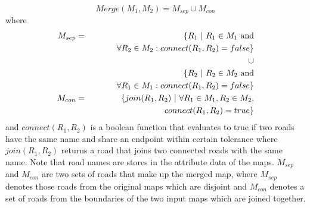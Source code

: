 \[
Merge(M_1, M_2) = M_{sep} \cup M_{con}
\]
where
\begin{eqnarray*}
M_{sep} &=& \{ R_1 ~|~ R_1 \in M_1~ {\rm and} \\
&& \hspace*{1cm} \forall R_2 \in M_2: connect(R_1, R_2) = false \} \\ 
&&\cup \\
&& \{ R_2 ~|~ R_2 \in M_2~ {\rm and}\\
&& \hspace*{1cm} \forall R_1 \in M_1: connect(R_1, R_2) = false \} \\
M_{con} &=& \{join(R_1, R_2) ~|~ \forall R_1 \in M_1, R_2 \in M_2, \\
&& \hspace*{1cm} connect(R_1, R_2) = true \} \\
\end{eqnarray*}
and $connect(R_1, R_2)$ is a boolean function that evaluates to true if
two roads have the same name and share an endpoint within certain tolerance
where $join(R_1, R_2)$ returns a road that joins two connected roads with the
same name. Note that road names are stores in the attribute data of the
maps. $M_{sep}$ and $M_{con}$ are two sets of roads that make up the merged map,
where $M_{sep}$ denotes those roads from the original maps which are disjoint
and $M_{con}$ denotes a set of roads from the boundaries of the two input maps
which are joined together. 
%
%

